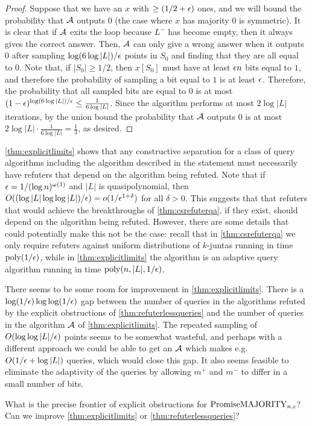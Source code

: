 \begin{proof}
Suppose that we have an $x$ with $\geq (1/2 + \epsilon)$ ones, and we will bound the probability that $\mathcal{A}$ outputs $0$ (the
case where $x$ has majority $0$ is symmetric).
It is clear that if $\mathcal{A}$ exits the loop because $L^-$ has become empty, then it always gives the correct answer.
Then, $\mathcal{A}$ can only give a wrong answer when it outputs $0$ after sampling $\log (6 \log |L|)/\epsilon$ points in $S_0$
and finding that they are all equal to $0$. 
Note that, if $|S_0| \geq 1/2$, then $x[S_0]$ must have
at least $\epsilon n$ bits equal to $1$, and therefore the probability of sampling a bit equal to $1$ is at least $\epsilon$.
Therefore, the probability that all sampled bits are equal to $0$ is at most 
$(1-\epsilon)^{\log (6 \log |L|)/\epsilon} \leq \frac{1}{6 \log |L|}$. 
Since the algorithm performs at most $2 \log |L|$ iterations,
by the union bound the probability that $\mathcal{A}$ outputs $0$
is at most $2 \log |L| \cdot \frac{1}{6 \log |L|} = \frac{1}{3}$, as desired. 



\end{proof}


\cref{thm:explicitlimits} shows that any constructive separation for a class of query algorithms including the algorithm described in 
the statement must necessarily have refuters that depend on the algorithm being refuted. 
Note that if $\epsilon = 1/(\log n)^{\omega(1)}$ and $|L|$ is quasipolynomial, then $O((\log |L| \log \log |L|)/\epsilon) = o(1/\epsilon^{1+\delta})$ for all 
$\delta > 0$. 
This suggests that that refuters that would achieve the breakthroughs of \cref{thm:csrefuterqa},
if they exist, should depend on the algorithm being refuted.
However, there are some details that could potentially make this not be the case: recall that
in \cref{thm:csrefuterqa} we only require refuters against uniform distributions of $k$-juntas
running in time $\text{poly}(1/\epsilon)$,
while in \cref{thm:explicitlimits} the algorithm is an adaptive
query algorithm running in time $\text{poly}(n, |L|, 1/\epsilon)$. 

There seems to be some room for improvement in \cref{thm:explicitlimits}.
There is a $\log (1/\epsilon) \log \log (1/\epsilon)$ gap between the number of 
queries in the algorithms refuted by the explicit obstructions of \cref{thm:refuterlessqueries}
and the number of queries in the 
algorithm $\mathcal{A}$ of \cref{thm:explicitlimits}.
The repeated sampling of $O(\log \log |L|/\epsilon)$ points seems to be somewhat wasteful, and 
perhaps with a different approach we could be able to get an $\mathcal{A}$ which makes e.g. $O(1/\epsilon + \log |L|)$ queries, 
which would close this gap.
It also seems feasible to eliminate the adaptivity of the queries by allowing $m^+$ and $m^-$
to differ in a small number of bits.  

\begin{question}
What is the precise frontier of explicit obstructions for $\mathrm{PromiseMAJORITY}_{n, \epsilon}$? Can we improve \cref{thm:explicitlimits} or \cref{thm:refuterlessqueries}?
\end{question}
